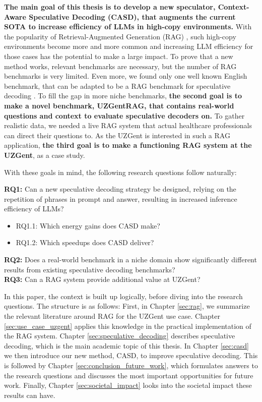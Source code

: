 \textbf{The main goal of this thesis is to develop a new speculator, Context-Aware Speculative Decoding (CASD), that augments the current SOTA to increase efficiency of LLMs in high-copy environments.} With the popularity of Retrieval-Augmented Generation (RAG) \cite{k2view2025GenAI, menlov2025state}, such high-copy environments become more and more common and increasing LLM efficiency for those cases has the potential to make a large impact. To prove that a new method works, relevant benchmarks are necessary, but the number of RAG benchmarks is very limited. Even more, we found only one well known English benchmark, that can be adapted to be a RAG benchmark for speculative decoding \cite{rajpurkar2016squad}. To fill the gap in more niche benchmarks, \textbf{the second goal is to make a novel benchmark, UZGentRAG, that contains real-world questions and context to evaluate speculative decoders on.} To gather realistic data, we needed a live RAG system that actual healthcare professionals can direct their questions to. As the UZGent is interested in such a RAG application, \textbf{the third goal is to make a functioning RAG system at the UZGent}, as a case study. 

With these goals in mind, the following research questions follow naturally:

\begin{tcolorbox}[colback=blue-ish-light,colframe=blue-ish,title=\textbf{Research Questions}, coltitle=white]
    \textbf{RQ1:} Can a new speculative decoding strategy be designed, relying on the repetition of phrases in prompt and answer, resulting in increased inference efficiency of LLMs?
    \begin{itemize}
    \item RQ1.1: Which energy gains does CASD make?
    \item RQ1.2: Which speedups does CASD deliver?
    \end{itemize}
    \textbf{RQ2:} Does a real-world benchmark in a niche domain show significantly different results from existing speculative decoding benchmarks? \\
    \textbf{RQ3:} Can a RAG system provide additional value at UZGent? \\
\end{tcolorbox}

In this paper, the context is built up logically, before diving into the research questions. The structure is as follows: First, in Chapter \ref{sec:rag}, we summarize the relevant literature around RAG for the UZGent use case. Chapter \ref{sec:use_case_uzgent} applies this knowledge in the practical implementation of the RAG system. Chapter \ref{sec:speculative_decoding} describes speculative decoding, which is the main academic topic of this thesis. In Chapter \ref{sec:casd} we then introduce our new method, CASD, to improve speculative decoding. This is followed by Chapter \ref{sec:conclusion_future_work}, which formulates answers to the research questions and discusses the most important opportunities for future work. Finally, Chapter \ref{sec:societal_impact} looks into the societal impact these results can have.